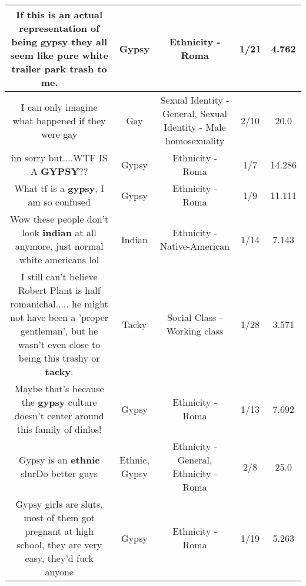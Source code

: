 \documentclass[11pt]{article}
\newlength\mylength
\begin{document}
\begin{center}
\begin{longtable}{|C{.65\mylength}|C{.30\mylength}|C{.12\mylength}|C{.12\mylength}|C{.12\mylength}|}
  \small If this is an actual representation of being \textbf{gypsy} they all seem like pure white trailer park trash to me. 🤦🏻‍♀️🤷🏻‍♀️\normalsize   & Gypsy & Ethnicity - Roma & 1/21 & 4.762 \\  \hline
  \small I can only imagine what happened if they were gay\normalsize   & Gay & Sexual Identity - General, Sexual Identity - Male homosexuality & 2/10 & 20.0 \\  \hline
  \small im sorry but....WTF IS A \textbf{GYPSY}??\normalsize   & Gypsy & Ethnicity - Roma & 1/7 & 14.286 \\  \hline
  \small What tf is a \textbf{gypsy}, I am so confused\normalsize   & Gypsy & Ethnicity - Roma & 1/9 & 11.111 \\  \hline
  \small Wow these people don't look \textbf{indian} at all anymore, just normal white americans lol\normalsize   & Indian & Ethnicity - Native-American & 1/14 & 7.143 \\  \hline
  \small I still can't believe Robert Plant is half romanichal..... he might not have been a 'proper gentleman', but he wasn't even close to being this trashy or \textbf{tacky}.\normalsize   & Tacky & Social Class - Working class & 1/28 & 3.571 \\  \hline
  \small Maybe that's because the \textbf{gypsy} culture doesn't center around this family of dinlos!\normalsize   & Gypsy & Ethnicity - Roma & 1/13 & 7.692 \\  \hline
  \small Gypsy is an \textbf{ethnic} slurDo better guys\normalsize   & Ethnic, Gypsy & Ethnicity - General, Ethnicity - Roma & 2/8 & 25.0 \\  \hline
  \small Gypsy girls are sluts, most of them got pregnant at high school, they are very easy, they'd fuck anyone\normalsize   & Gypsy & Ethnicity - Roma & 1/19 & 5.263 \\  \hline

\end{longtable}
\end{center}
\end{document}
